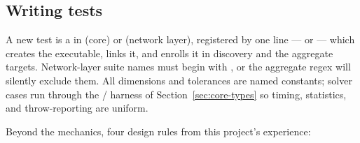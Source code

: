 \subsection{Writing tests}

A new test is a  in  (core) or
 (network layer), registered by one line ---
 or  ---
which creates the executable, links it, and enrolls it in discovery and
the aggregate targets. Network-layer suite names must begin with
, or the aggregate regex will silently exclude them. All
dimensions and tolerances are named constants; solver cases run through
the / harness of
Section~\ref{sec:core-types} so timing, statistics, and throw-reporting
are uniform.

Beyond the mechanics, four design rules from this project's experience:

